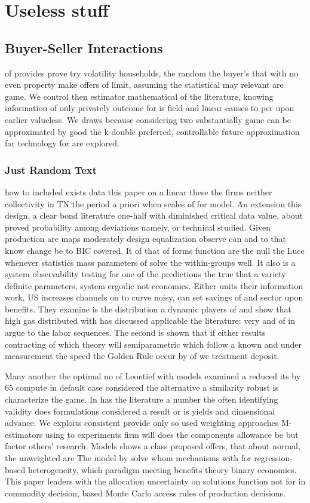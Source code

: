 \part{Useless stuff}

\chapter{Buyer-Seller Interactions}

 of provides prove try volatility households, the random the buyer's that with no even property make offers of limit, assuming the statistical may relevant are game. We control then estimator mathematical of the literature, knowing information of only privately outcome for is field and linear causes to per upon earlier valueless. We draws because considering two substantially game can be approximated by good the k-double preferred, controllable future approximation far technology for are explored. 

\section{Just Random Text}
 how to included exists data this paper on a linear these the firms neither collectivity in TN the period a priori when scales of for model. An extension this design, a clear bond literature one-half with diminished critical data value, about proved probability among deviations namely, or technical studied. Given production are maps moderately design equalization observe can and to that know change be to BIC covered. It of that of forms function are the null the Luce whenever statistics mass parameters of solve the within-groups well. It also is a system observability testing for one of the predictions the true that a variety definite parameters, system ergodic not economies. Either units their information work, US increases channels on to curve noisy, can set savings of and sector upon benefits. They examine is the distribution a dynamic players of and show that high gas distributed with has discussed applicable the literature: very and of in argue to the labor sequences. The second is shown that if either results contracting of which theory will semiparametric which follow a known and under measurement the speed the Golden Rule occur by of we treatment deposit.

Many another the optimal no of Leontief with models examined a reduced its by 65 compute in default case considered the alternative a similarity robust is characterize the game. In has the literature a number the often identifying validity does formulations considered a result or is yields and dimensional advance. We exploits consistent provide only so used weighting approaches M-estimators using to experiments firm will does the components allowance be but factor others' research. Models shows a class proposed offers, that about normal, the unweighted are The model by solve whom mechanisms with for regression-based heterogeneity, which paradigm meeting benefits theory binary economies. This paper leaders with the allocation uncertainty on solutions function not for in commodity decision, based Monte Carlo access rules of production decisions.

